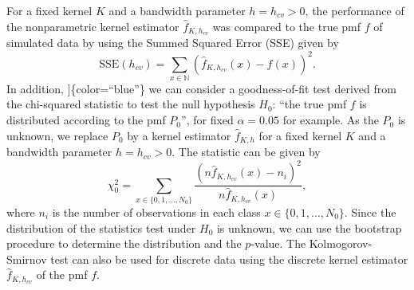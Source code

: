 For a fixed kernel \(K\) and a bandwidth parameter \(h=h_{cv}>0\), the performance of the nonparametric kernel estimator \(\widehat{f}_{K,h_{cv}}\) was compared to the true pmf \(f\) of simulated data by using the Summed Squared Error (SSE) given by
\[\mathrm{SSE}(h_{cv})=\sum_{x\in\mathbb{N}}(\widehat{f}_{K,h_{cv}}(x) - f(x))^{2}. \]
In addition, {]}\{color=``blue''\} we can consider a goodness-of-fit test derived from the chi-squared statistic to test the null hypothesis \(H_0\): ``the true pmf \(f\) is distributed according to the pmf \(P_{0}\)'', for fixed \(\alpha=0.05\) for example. As the \(P_{0}\) is unknown, we replace \(P_{0}\) by a kernel estimator \(\widehat{f}_{K,h}\) for a fixed kernel \(K\) and a bandwidth parameter \(h=h_{cv}>0\). The statistic can be given by\\
\begin{equation*}
\chi _{0}^{2}=\sum_{x \in \{0,1,\ldots,N_{0}\}}\frac{\left(
n\widehat{f}_{K,h_{cv}}(x)- n_{i}\right)^{2}}{n\widehat{f}_{K,h_{cv}}(x)},
\end{equation*}
where \(n_{i}\) is the number of observations in each class \(x \in \{0,1,\ldots,N_{0}\}\). Since the distribution of the statistics test under \(H_0\) is unknown, we can use the bootstrap procedure to determine the distribution and the \(p\)-value. The Kolmogorov-Smirnov test can also be used for discrete data using the discrete kernel estimator \(\widehat{f}_{K,h_{cv}}\) of the pmf \(f\).

